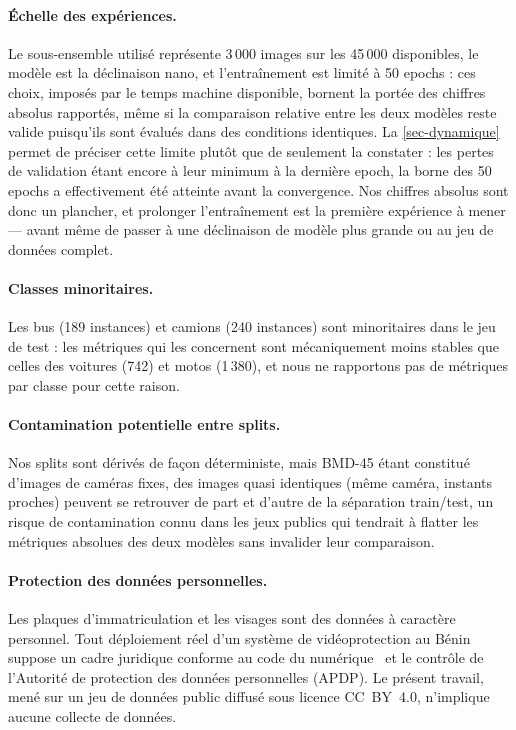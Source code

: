 \paragraph{Échelle des expériences.}
Le sous-ensemble utilisé représente 3\,000 images sur les 45\,000
disponibles, le modèle est la déclinaison nano, et l'entraînement est
limité à 50 epochs : ces choix, imposés par le temps machine disponible,
bornent la portée des chiffres absolus rapportés, même si la comparaison
relative entre les deux modèles reste valide puisqu'ils sont évalués dans
des conditions identiques. La \cref{sec-dynamique} permet de préciser
cette limite plutôt que de seulement la constater : les pertes de
validation étant encore à leur minimum à la dernière epoch, la borne des
50 epochs a effectivement été atteinte avant la convergence. Nos chiffres
absolus sont donc un plancher, et prolonger l'entraînement est la
première expérience à mener — avant même de passer à une déclinaison de
modèle plus grande ou au jeu de données complet.

\paragraph{Classes minoritaires.}
Les bus (189 instances) et camions (240 instances) sont minoritaires
dans le jeu de test : les métriques qui les concernent sont
mécaniquement moins stables que celles des voitures (742) et motos
(1\,380), et nous ne rapportons pas de métriques par classe pour cette
raison.

\paragraph{Contamination potentielle entre splits.}
Nos splits sont dérivés de façon déterministe, mais BMD-45 étant
constitué d'images de caméras fixes, des images quasi identiques
(même caméra, instants proches) peuvent se retrouver de part et d'autre
de la séparation train/test, un risque de contamination connu dans les
jeux publics qui tendrait à flatter les métriques absolues des deux
modèles sans invalider leur comparaison.

\paragraph{Protection des données personnelles.}
Les plaques d'immatriculation et les visages sont des données à
caractère personnel. Tout déploiement réel d'un système de
vidéoprotection au Bénin suppose un cadre juridique conforme au code du
numérique~\cite{benin2017code} et le contrôle de l'Autorité de
protection des données personnelles (APDP). Le présent travail, mené sur
un jeu de données public diffusé sous licence CC~BY~4.0, n'implique
aucune collecte de données.
